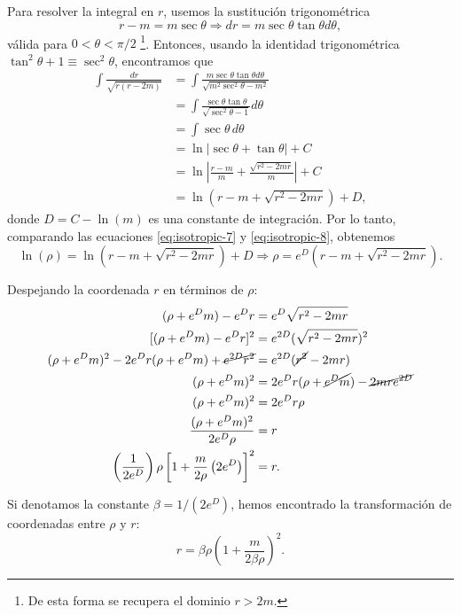 \documentclass[letterpaper,11pt]{article}
\begin{document}
Para resolver la integral en $r$, usemos la sustitución trigonométrica 
\begin{equation}
    r - m = m \sec\theta \Rightarrow dr = m \sec\theta \tan\theta d\theta,
\end{equation}
válida para $0 < \theta < \pi/2$ \footnote{De esta forma se recupera el dominio $r > 2m$.}. Entonces, usando la identidad trigonométrica $\tan^2\theta + 1 \equiv \sec^2\theta$, encontramos que
\begin{align}
    \int \frac{dr}{\sqrt{r(r-2m)}} &= \int \frac{m \sec\theta \tan\theta d\theta}{\sqrt{m^2 \sec^2\theta - m^2}} \nonumber \\
    &= \int \frac{\sec\theta \tan \theta}{\sqrt{\sec^2\theta - 1}} d\theta \nonumber \\
    &= \int \sec\theta \,d\theta \nonumber \\
    &= \ln|\sec\theta + \tan \theta| + C \nonumber \\
    &= \ln\left|\frac{r-m}{m} + \frac{\sqrt{r^2 - 2mr}}{m} \right| + C \nonumber \\
    &= \ln\left(r -m +\sqrt{r^2-2mr}\right) + D, \label{eq:isotropic-8}
\end{align}
donde $D = C- \ln(m)$ es una constante de integración. Por lo tanto, comparando las ecuaciones \eqref{eq:isotropic-7} y \eqref{eq:isotropic-8}, obtenemos 
\begin{equation}
    \ln(\rho) = \ln\left(r -m +\sqrt{r^2-2mr}\right) + D \Rightarrow \rho = e^{D} \left(r -m +\sqrt{r^2-2mr}\right).
\end{equation}

Despejando la coordenada $r$ en términos de $\rho$:
\begin{align}
    (\rho + e^D m) - e^D r &= e^D \sqrt{r^2-2mr} \\
    [(\rho + e^D m) - e^D r]^2 &= e^{2D} (\sqrt{r^2-2mr} )^2\\
    (\rho + e^D m)^2 - 2 e^D r (\rho + e^D m) + \cancel{e^{2D} r^2} &= e^{2D} (\cancel{r^2} - 2mr) \\
    (\rho + e^D m)^2 &= 2 e^D r(\rho + \cancel{e^{D} m}) - \cancel{2mr e^{2D}} \\
    (\rho + e^D m)^2 &= 2 e^D r \rho \\
    \frac{(\rho + e^D m)^2}{2 e^D \rho} &= r \\
    \left(\frac{1}{2e^D}\right) \rho \left[ 1 + \frac{m}{2\rho} \left( 2 e^D \right) \right]^2 &= r.
\end{align}

Si denotamos la constante $\beta = 1/(2e^D)$, hemos encontrado la transformación de coordenadas entre $\rho$ y $r$:
\begin{equation} 
    r = \beta \rho \left( 1+ \frac{m}{2\beta \rho} \right)^2.
\end{equation}
\end{document}
